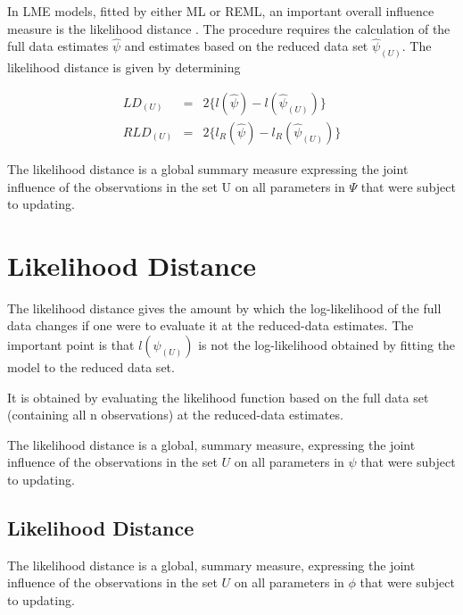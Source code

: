 \documentclass[12pt, a4paper]{article}
\begin{document}
	In LME models, fitted by either ML or REML, an important overall
	influence measure is the likelihood distance \citep{cook82}. The
	procedure requires the calculation of the full data estimates
	$\hat{\psi}$ and estimates based on the reduced data set
	$\hat{\psi}_{(U)}$. The likelihood distance is given by
	determining
	
	
	\begin{eqnarray}
	LD_{(U)} &=& 2\{l(\hat{\psi}) - l( \hat{\psi}_{(U)}) \}\\
	RLD_{(U)} &=& 2\{l_{R}(\hat{\psi}) - l_{R}(\hat{\psi}_{(U)})\}
	\end{eqnarray}

\bigskip

The likelihood distance is a global summary measure expressing the joint influence of the observations in the set U on all parameters in $\Psi$ that were subject to updating.



\section{Likelihood Distance} %
The likelihood distance gives the amount by which the log-likelihood of the full data changes if one were
to evaluate it at the reduced-data estimates. The important point is that $l(\psi_{(U)})$ is not the log-likelihood
obtained by fitting the model to the reduced data set.

It is obtained by evaluating the likelihood function based on the full data set (containing all n observations) at the reduced-data estimates.

The likelihood distance is a global, summary measure, expressing the joint influence of the observations in
the set $U$ on all parameters in $\psi$  that were subject to updating.

\subsection{Likelihood Distance}

The  likelihood distance is a global, summary measure, expressing the joint influence of the observations in the set $U$ on all parameters in $\phi$  that were subject to updating.
\end{document}
